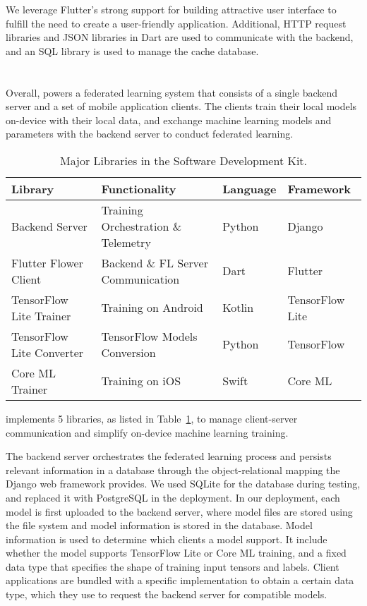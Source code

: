 We leverage Flutter's strong support for
building attractive user interface to fulfill the need to
create a user-friendly application.
Additional, HTTP request libraries and JSON libraries in Dart are used to
communicate with the backend,
and an SQL library is used to manage the cache database.

\section{\fedkit}

Overall, \fedkit powers a federated learning system that
consists of a single backend server and a set of mobile application clients.
The clients train their local models on-device with their local data,
and exchange machine learning models and parameters with the backend server to
conduct federated learning.

\begin{table}\begin{center}
    \begin{tabular}{llll}
Library&Functionality&Language&Framework\\\hline
Backend Server&Training Orchestration \& Telemetry&Python&Django\\
Flutter Flower Client&Backend \& FL Server Communication&Dart&Flutter\\
TensorFlow Lite Trainer&Training on Android&Kotlin&TensorFlow Lite\\
TensorFlow Lite Converter&TensorFlow Models Conversion&Python&TensorFlow\\
Core ML Trainer&Training on iOS&Swift&Core ML
    \end{tabular}
    \caption{Major Libraries in the \fedkit Software Development Kit.}
\label{table:libs}
\end{center}\end{table}

\fedkit implements 5 libraries, as listed in Table~\ref{table:libs},
to manage client-server communication and simplify on-device machine learning
training.

The backend server orchestrates the federated learning process and persists
relevant information in a database through the object-relational mapping the
Django web framework provides. We used SQLite for the database during testing,
and replaced it with PostgreSQL in the deployment. In our deployment,
each model is first uploaded to the backend server,
where model files are stored using the file system and model information is
stored in the database.
Model information is used to determine which clients a model support.
It include whether the model supports TensorFlow Lite or Core ML training,
and a fixed data type that specifies the shape of training input tensors and
labels.
Client applications are bundled with a specific implementation to obtain a
certain data type,
which they use to request the backend server for compatible models.

